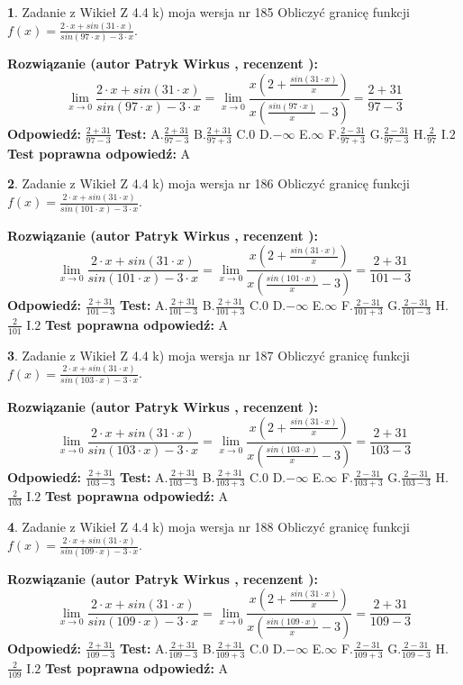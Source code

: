 \documentclass[12pt, a4paper]{article}
\theoremstyle{definition} %
\newtheorem{zad}{}
\newcommand{\zadStart}[1]{\begin{zad}#1\newline}
\newcommand{\zadStop}{\end{zad}}
\newcommand{\rozwStart}[2]{\noindent \textbf{Rozwiązanie (autor #1 , recenzent #2): }\newline}
\newcommand{\rozwStop}{\newline}
\newcommand{\odpStart}{\noindent \textbf{Odpowiedź:}\newline}
\newcommand{\odpStop}{\newline}
\newcommand{\testStart}{\noindent \textbf{Test:}\newline}
\newcommand{\testStop}{\newline}
\newcommand{\kluczStart}{\noindent \textbf{Test poprawna odpowiedź:}\newline}
\newcommand{\kluczStop}{\newline}
\begin{document}
\zadStart{Zadanie z Wikieł Z 4.4 k) moja wersja nr 185}
Obliczyć granicę funkcji $f(x)=\frac{2\cdot x +sin(31\cdot x)}{sin(97\cdot x) -3\cdot x}$.
\zadStop
\rozwStart{Patryk Wirkus}{}
$$\lim\limits_{x\to 0}\frac{2\cdot x +sin(31\cdot x)}{sin(97\cdot x) -3\cdot x}
=\lim\limits_{x\to 0}\frac{x(2+\frac{sin(31\cdot x)}{x})}{x(\frac{sin(97\cdot x)}{x}-3)}
=\frac{2+31}{97-3}$$
\rozwStop
\odpStart
$\frac{2+31}{97-3}$
\odpStop
\testStart
A.$\frac{2+31}{97-3}$
B.$\frac{2+31}{97+3}$
C.$0$
D.$-\infty$
E.$\infty$
F.$\frac{2-31}{97+3}$
G.$\frac{2-31}{97-3}$
H.$\frac{2}{97}$
I.$2$
\testStop
\kluczStart
A
\kluczStop



\zadStart{Zadanie z Wikieł Z 4.4 k) moja wersja nr 186}
Obliczyć granicę funkcji $f(x)=\frac{2\cdot x +sin(31\cdot x)}{sin(101\cdot x) -3\cdot x}$.
\zadStop
\rozwStart{Patryk Wirkus}{}
$$\lim\limits_{x\to 0}\frac{2\cdot x +sin(31\cdot x)}{sin(101\cdot x) -3\cdot x}
=\lim\limits_{x\to 0}\frac{x(2+\frac{sin(31\cdot x)}{x})}{x(\frac{sin(101\cdot x)}{x}-3)}
=\frac{2+31}{101-3}$$
\rozwStop
\odpStart
$\frac{2+31}{101-3}$
\odpStop
\testStart
A.$\frac{2+31}{101-3}$
B.$\frac{2+31}{101+3}$
C.$0$
D.$-\infty$
E.$\infty$
F.$\frac{2-31}{101+3}$
G.$\frac{2-31}{101-3}$
H.$\frac{2}{101}$
I.$2$
\testStop
\kluczStart
A
\kluczStop



\zadStart{Zadanie z Wikieł Z 4.4 k) moja wersja nr 187}
Obliczyć granicę funkcji $f(x)=\frac{2\cdot x +sin(31\cdot x)}{sin(103\cdot x) -3\cdot x}$.
\zadStop
\rozwStart{Patryk Wirkus}{}
$$\lim\limits_{x\to 0}\frac{2\cdot x +sin(31\cdot x)}{sin(103\cdot x) -3\cdot x}
=\lim\limits_{x\to 0}\frac{x(2+\frac{sin(31\cdot x)}{x})}{x(\frac{sin(103\cdot x)}{x}-3)}
=\frac{2+31}{103-3}$$
\rozwStop
\odpStart
$\frac{2+31}{103-3}$
\odpStop
\testStart
A.$\frac{2+31}{103-3}$
B.$\frac{2+31}{103+3}$
C.$0$
D.$-\infty$
E.$\infty$
F.$\frac{2-31}{103+3}$
G.$\frac{2-31}{103-3}$
H.$\frac{2}{103}$
I.$2$
\testStop
\kluczStart
A
\kluczStop



\zadStart{Zadanie z Wikieł Z 4.4 k) moja wersja nr 188}
Obliczyć granicę funkcji $f(x)=\frac{2\cdot x +sin(31\cdot x)}{sin(109\cdot x) -3\cdot x}$.
\zadStop
\rozwStart{Patryk Wirkus}{}
$$\lim\limits_{x\to 0}\frac{2\cdot x +sin(31\cdot x)}{sin(109\cdot x) -3\cdot x}
=\lim\limits_{x\to 0}\frac{x(2+\frac{sin(31\cdot x)}{x})}{x(\frac{sin(109\cdot x)}{x}-3)}
=\frac{2+31}{109-3}$$
\rozwStop
\odpStart
$\frac{2+31}{109-3}$
\odpStop
\testStart
A.$\frac{2+31}{109-3}$
B.$\frac{2+31}{109+3}$
C.$0$
D.$-\infty$
E.$\infty$
F.$\frac{2-31}{109+3}$
G.$\frac{2-31}{109-3}$
H.$\frac{2}{109}$
I.$2$
\testStop
\kluczStart
A
\kluczStop
\end{document}
